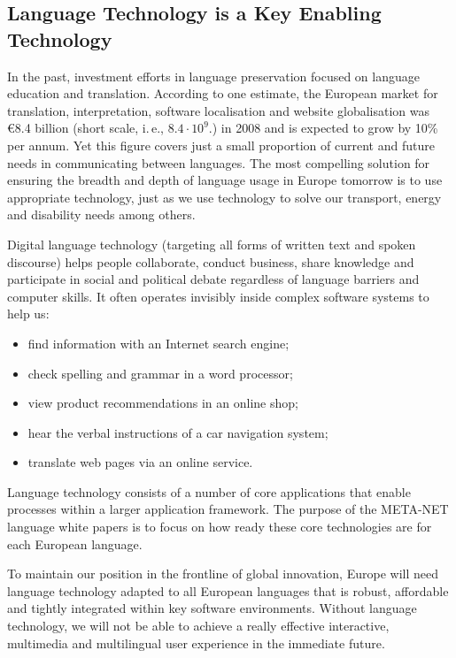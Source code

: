 \begin{multicols}{2}
\subsection{Language Technology is a Key Enabling Technology}
In the past, investment efforts in language preservation focused on language education and translation. According to one estimate, the European market for translation, interpretation, software localisation and website globalisation was €8.4 billion (short scale, i.\,e., $8.4\cdot 10^9$.) in 2008 and is expected to grow by 10\% per annum\cite{EC3}. Yet this figure covers just a small proportion of current and future needs in communicating between languages. The most compelling solution for ensuring the breadth and depth of language usage in Europe tomorrow is to use appropriate technology, just as we use technology to solve our transport, energy and disability needs among others.

Digital language technology (targeting all forms of written text and spoken discourse) helps people collaborate, conduct business, share knowledge and participate in social and political debate regardless of language barriers and computer skills. It often operates invisibly inside complex software systems to help us:

\begin{itemize}
\item find information with an Internet search engine;
\item check spelling and grammar in a word processor;
\item view product recommendations in an online shop;
\item hear the verbal instructions of a car navigation system;
\item translate web pages via an online service.
\end{itemize}


Language technology consists of a number of core applications that enable processes within a larger application framework. The purpose of the META-NET language white papers is to focus on how ready these core technologies are for each European language.

To maintain our position in the frontline of global innovation, Europe will need language technology adapted to all European languages that is robust, affordable and tightly integrated within key software environments. Without language technology, we will not be able to achieve a really effective interactive, multimedia and multilingual user experience in the immediate future. 


\end{multicols}
